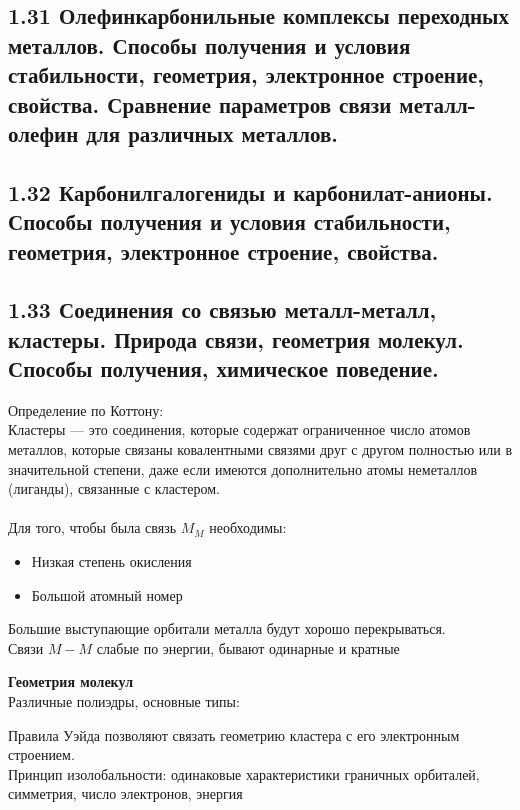 \subsection{1.31 Олефинкарбонильные комплексы переходных металлов. Способы получения и условия стабильности, геометрия, электронное строение, свойства. Сравнение параметров связи металл-олефин для различных металлов.	}

\subsection{1.32 Карбонилгалогениды и карбонилат-анионы. Способы получения и условия стабильности, геометрия, электронное строение, свойства.}

\subsection{1.33 Соединения со связью металл-металл, кластеры. Природа связи, геометрия молекул. Способы получения, химическое поведение.}
Определение по Коттону: \noindent \\
Кластеры — это соединения, которые содержат ограниченное число атомов металлов, которые связаны ковалентными связями друг с другом полностью или в значительной степени, даже если имеются дополнительно атомы неметаллов (лиганды), связанные с кластером. \\ \\
Для того, чтобы была связь $M_M$ необходимы:
\begin{itemize}
	\item Низкая степень окисления
	\item Большой атомный номер
\end{itemize}
Большие выступающие орбитали металла будут хорошо перекрываться. \\
Связи $M-M$ слабые по энергии, бывают одинарные и кратные\\
\begin{figure} [H]
	\centering {\texttt{[image: ff2]}}
\end{figure}
\textbf{Геометрия молекул}\\
Различные полиэдры, основные типы:
\begin{figure} [H]
	\centering {\texttt{[image: ff1]}}
\end{figure}
Правила Уэйда позволяют связать геометрию кластера с его электронным строением. \\
Принцип изолобальности: одинаковые характеристики граничных орбиталей, симметрия, число электронов, энергия \\
